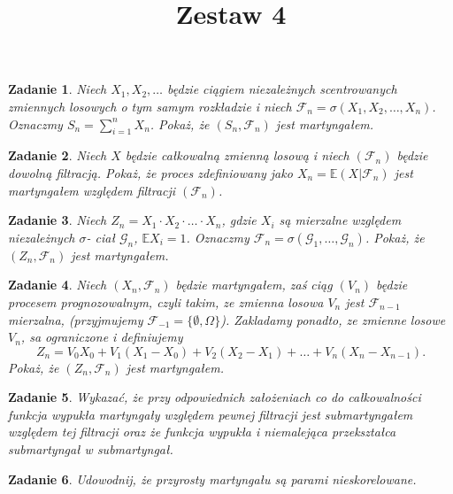 \documentclass{mwart}
\title{Zestaw 4}
\newtheorem{zd}{Zadanie}
\begin{document}

\maketitle


\begin{zd}
Niech $X_1, X_2, \dots$ będzie ciągiem niezależnych scentrowanych zmiennych losowych o tym samym rozkładzie i niech $\mathcal{F}_n = \sigma(X_1, X_2, \dots, X_n)$. Oznaczmy $S_n = \sum_{i=1}^nX_n$. Pokaż, że $(S_n, \mathcal{F}_n)$ jest martyngałem.
\end{zd}


\begin{zd}
Niech $X$ będzie całkowalną zmienną losową i niech $(\mathcal{F}_n)$ będzie dowolną filtracją. Pokaż, że proces zdefiniowany jako $X_n = \mathbb{E}(X|\mathcal{F}_n)$ jest martyngałem względem filtracji $(\mathcal{F}_n)$.
\end{zd}

\begin{zd}
Niech $Z_n = X_1\cdot X_2 \cdot \dots \cdot X_n$, gdzie $X_i$ są mierzalne względem niezależnych $\sigma$- ciał $\mathcal{G}_n$, $\mathbb{E}X_i = 1$. Oznaczmy $\mathcal{F}_n = \sigma(\mathcal{G}_1, \dots, \mathcal{G}_n)$. Pokaż, że $(Z_n, \mathcal{F}_n)$ jest martyngałem.
\end{zd}

\begin{zd}
Niech $(X_n, \mathcal{F}_n)$ będzie martyngałem, zaś ciąg $(V_n)$ będzie procesem prognozowalnym, czyli takim, ze zmienna losowa $V_n$ jest $\mathcal{F}_{n-1}$ mierzalna, (przyjmujemy $\mathcal{F}_{-1} = \{\emptyset, \Omega\}$). Zakladamy ponadto, ze zmienne losowe $V_n$, sa ograniczone i definiujemy
\begin{displaymath}
Z_n = V_0X_0 + V_1(X_1-X_0) + V_2(X_2-X_1) + \dots + V_n(X_n - X_{n-1}).
\end{displaymath}
Pokaż, że $(Z_n, \mathcal{F}_n)$ jest martyngałem.
\end{zd}

\begin{zd}
Wykazać, że przy odpowiednich założeniach co do całkowalności funkcja wypukła martyngały względem pewnej filtracji jest submartyngałem względem tej filtracji oraz że funkcja wypukła i niemalejąca przekształca submartyngał w submartyngał.
\end{zd}

\begin{zd}
Udowodnij, że przyrosty martyngału są parami nieskorelowane.
\end{zd}
\end{document}
